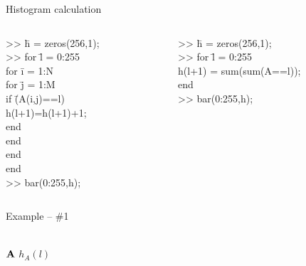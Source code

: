 %
%
\begin{slide}{Histogram calculation}

\begin{columns}
\begin{column}{0.5\textwidth}

\begin{code}[8]{}
\begin{tabbing}
>>  \=  h = zeros(256,1);    \\
>>  \> for  \= l = 0:255            \\
    \>      \> for  \= i = 1:N               \\
    \>      \>       \> for \=  j = 1:M                \\
    \>	\>	\>	\>      if  \= (A(i,j)==l)        \\
    \>	\>	\>	\>  \>      h(l+1)=h(l+1)+1;   \\
    \>	\>	\>	\>      end  \\
    \>      \>  \> end  \\
    \>      \> end  \\
    \> end  \\
>>  \> bar(0:255,h);   \\
\end{tabbing}
\end{code}

\end{column}
\begin{column}{0.5\textwidth}

\begin{code}[8]{}

\begin{tabbing}
>>  \=  h = zeros(256,1); \\
>>	\>	for  \= l = 0:255   \\
	\>  \>   h(l+1) = sum(sum(A==l)); \\
	\>  end \\
>> \> bar(0:255,h);  \\
\end{tabbing}  
\end{code}
\end{column}
\end{columns}
\end{slide}


%
%
\begin{slide}{Example -- \#1}

\\
\centering
${\bf A}$ \hspace{0.4\textwidth} $h_A(l)$

\end{slide}


